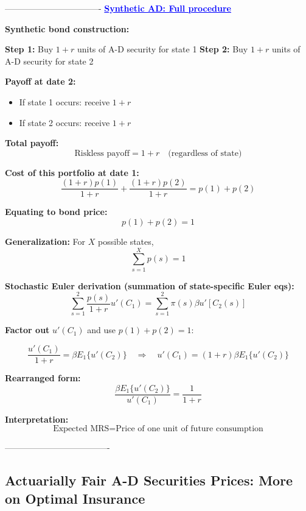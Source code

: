 \documentclass[12pt]{article}
\begin{document}
----------------------------------
\textcolor{blue}{\textbf{\uline{Synthetic AD: Full procedure}}}

{\color{blue}
\textbf{Synthetic bond construction:}

\textbf{Step 1:} Buy \( 1 + r \) units of A-D security for state 1  
\textbf{Step 2:} Buy \( 1 + r \) units of A-D security for state 2

\textbf{Payoff at date 2:}
\begin{itemize}
\item If state 1 occurs: receive \( 1 + r \)
\item If state 2 occurs: receive \( 1 + r \)
\end{itemize}

\textbf{Total payoff:}  
\[
\text{Riskless payoff} = 1 + r \quad \text{(regardless of state)}
\]

\textbf{Cost of this portfolio at date 1:}
\[
\frac{(1 + r)p(1)}{1 + r} + \frac{(1 + r)p(2)}{1 + r}
= p(1) + p(2)
\]

\textbf{Equating to bond price:}
\[
p(1) + p(2) = 1 \tag{7}
\]

\textbf{Generalization:} For \( X \) possible states,
\[
\sum_{s = 1}^{X} p(s) = 1
\]

\textbf{Stochastic Euler derivation (summation of state-specific Euler eqs):}
\[
\sum_{s=1}^{2} \frac{p(s)}{1 + r} u'(C_1) = \sum_{s=1}^{2} \pi(s) \beta u'[C_2(s)]
\]

\textbf{Factor out } \( u'(C_1) \) and use \( p(1) + p(2) = 1 \):

\[
\frac{u'(C_1)}{1 + r} = \beta E_1\{u'(C_2)\}
\quad \Rightarrow \quad
u'(C_1) = (1 + r) \beta E_1\{u'(C_2)\} \tag{8}
\]

\textbf{Rearranged form:}
\[
\frac{\beta E_1\{u'(C_2)\}}{u'(C_1)} = \frac{1}{1 + r}
\]

\textbf{Interpretation:}
\[
\text{Expected MRS} = \text{Price of one unit of future consumption}
\]
}

-------------------------------------

\subsection*{\noindent\textbf{Actuarially Fair A-D Securities Prices: More on Optimal Insurance}}
\end{document}
